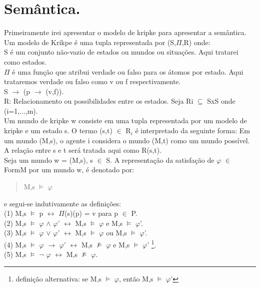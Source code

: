 \documentclass[12pt]{report}
\begin{document}
\section{Semântica.}
 \hspace{0.5cm}  Primeiramente irei apresentar o modelo de kripke para apresentar a semântica. Um modelo de Krikpe é uma tupla representada por (S,$\Pi$,R) onde:\\
\indent S é um conjunto não-vazio de estados ou mundos ou situações. Aqui tratarei como estados.\\
\indent $\Pi$ é uma função que atribui verdade ou falso para os átomos por estado. Aqui trataremos verdade ou falso como v ou f respectivamente.\\
\indent S $\rightarrow$ (p $\rightarrow$ (v,f)).\\
\indent R: Relacionamento ou possibilidades entre os estados. Seja Ri $\subseteq$ SxS onde (i=1,...,m).\\
           \indent Um mundo de kripke w consiste em uma tupla representada por um modelo de kripke e um estado s. O termo (s,t) $\in$ R$_{i}$ é interpretado da seguinte forma: Em um mundo (M,s), o agente i considera o mundo (M,t) como um mundo possível. A relação entre s e t será tratada aqui como R(s,t).\\
 \indent Seja um mundo w = (M,s), s $\in$ S. A representação da satisfação de $\varphi$ $\in$ FormM por um mundo w, é denotado por:\\
 \begin{quote}
 \indent M,s $\vDash$ $\varphi$\\
 \end{quote}
 e segui-se indutivamente as definições:\\
\indent (1) M,s $\vDash$ p $\leftrightarrow$ $\Pi$(s)(p) = v para p $\in$ P.\\
\indent (2) M,s $\vDash$ $\varphi$ $\land$ $\varphi$' $\leftrightarrow$ M,s $\vDash$ $\varphi$ e M,s $\vDash$ $\varphi$'.\\
\indent (3) M,s $\vDash$ $\varphi$ $\vee$ $\varphi$' $\leftrightarrow$ M,s $\vDash$ $\varphi$ ou M,s $\vDash$ $\varphi$'.\\
\indent (4) M,s $\vDash$ $\varphi$ $\rightarrow$ $\varphi$' $\leftrightarrow$ M,s $\nvDash$  $\varphi$ e M,s $\vDash$ $\varphi$' \footnote{definição alternativa: se M,s $\vDash$ $\varphi$, então M,s $\vDash$ $\varphi$'}. \\
\indent (5) M,s $\vDash$ $\neg$ $\varphi$ $\leftrightarrow$ M,s $\nvDash$ $\varphi$.\\
\end{document}
